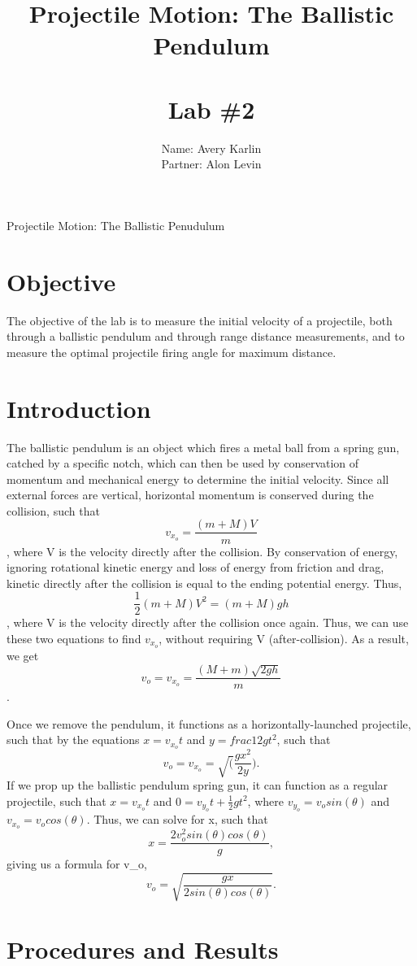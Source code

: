 \documentclass[11pt, titlepage]{article}
\title{Projectile Motion: The Ballistic Pendulum \\ \ \\ \large Lab \#2}
\author{Name: Avery Karlin \\ Partner: Alon Levin}
\date{}
\begin{document}
\maketitle

\begin{center}
\LARGE Projectile Motion: The Ballistic Penudulum
\end{center}

\section*{Objective}
The objective of the lab is to measure the initial velocity of a projectile, both through a ballistic pendulum and through range distance measurements, and to measure the optimal projectile firing angle for maximum distance. 
\section*{Introduction}
The ballistic pendulum is an object which fires a metal ball from a spring gun, catched by a specific notch, which can then be used by conservation of momentum and mechanical energy to determine the initial velocity. Since all external forces are vertical, horizontal momentum is conserved during the collision, such that $$v_{x_o} = \frac{(m + M)V}{m}$$, where V is the velocity directly after the collision. By conservation of energy, ignoring rotational kinetic energy and loss of energy from friction and drag, kinetic directly after the collision is equal to the ending potential energy. Thus, $$\frac{1}{2}(m + M)V^2 = (m + M)gh$$, where V is the velocity directly after the collision once again. Thus, we can use these two equations to find $v_{x_o}$, without requiring V (after-collision). As a result, we get $$v_o = v_{x_o} = \frac{(M+m)\sqrt{2gh}}{m}$$.

Once we remove the pendulum, it functions as a horizontally-launched projectile, such that by the equations $x = v_{x_o}t$ and $y = frac{1}{2}gt^2$, such that $$v_o = v_{x_o} = \sqrt(\frac{gx^2}{2y}).$$ If we prop up the ballistic pendulum spring gun, it can function as a regular projectile, such that $x = v_{x_o}t$ and $0 = v_{y_o}t + \frac{1}{2}gt^2$, where $v_{y_o} = v_osin(\theta)$ and $v_{x_o} = v_ocos(\theta)$. Thus, we can solve for x, such that $$x = \frac{2v_o^2sin(\theta)cos(\theta)}{g},$$ giving us a formula for v_o, $$v_o = \sqrt{\frac{gx}{2sin(\theta)cos(\theta)}}.$$

\section*{Procedures and Results}
\end{document}
